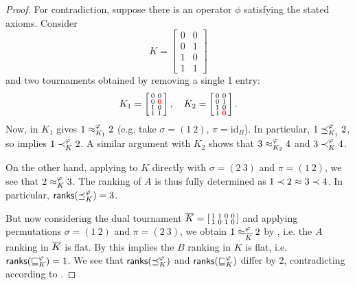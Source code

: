 \begin{proof}

    For contradiction, suppose there is an operator $\phi$ satisfying the
    stated axioms. Consider
    \[
        K = \left[\begin{smallmatrix}
            0 & 0 \\
            0 & 1 \\
            1 & 0 \\
            1 & 1
        \end{smallmatrix}\right]
    \]
    and two tournaments obtained by removing a single 1 entry:
    \[
        K_1 = \left[\begin{smallmatrix}
            0 & 0 \\
            0 & \bm{{\color{red}0}} \\
            1 & 0 \\
            1 & 1
        \end{smallmatrix}\right],
        \quad
        K_2 = \left[\begin{smallmatrix}
            0 & 0 \\
            0 & 1 \\
            1 & 0 \\
            1 & \bm{{\color{red}0}}
        \end{smallmatrix}\right].
    \]
    Now,  in $K_1$ gives $1 \approx_{K_1}^\varphi 2$ (e.g. take
    $\sigma = (1\ 2)$, $\pi = \text{id}_B$). In particular, $1 \preceq_{K_1}^\varphi
    2$, so  implies $1 \prec_K^\varphi 2$. A similar argument
    with $K_2$ shows that $3 \approx_{K_2}^\varphi 4$ and $3 \prec_K^\varphi 4$.

    On the other hand, applying  to $K$ directly with $\sigma =
    (2\ 3)$ and $\pi = (1\ 2)$, we see that $2 \approx_K^\varphi 3$. The ranking of
    $A$ is thus fully determined as $1 \prec 2 \approx 3 \prec 4$. In particular,
    $\mathsf{ranks}({\preceq_K^\varphi}) = 3$.

    But now considering the dual tournament ${\overline{K}} =
    \left[\begin{smallmatrix} 1&1&0&0 \\ 1&0&1&0 \end{smallmatrix}\right]$ and
    applying permutations $\sigma = (1\ 2)$ and $\pi = (2\ 3)$, we obtain $1
    \approx_{{\overline{K}}}^\varphi 2$ by , i.e. the $A$ ranking in
    ${\overline{K}}$ is flat. By  this implies the $B$ ranking in $K$
    is flat, i.e. $\mathsf{ranks}({\sqsubseteq_K^\varphi}) = 1$. We see that $\mathsf{ranks}({\preceq_K^\varphi})$
    and $\mathsf{ranks}({\sqsubseteq_K^\varphi})$ differ by 2, contradicting 
    according to .
\end{proof}

